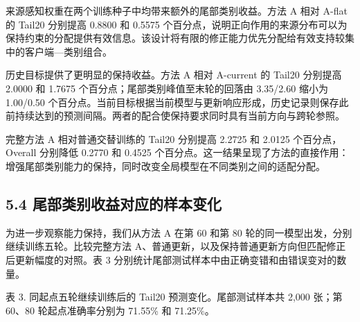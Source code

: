 \documentclass[UTF8,a4paper,10pt,fontset=fandol]{ctexart}
\begin{document}
来源感知权重在两个训练种子中均带来额外的尾部类别收益。方法 A 相对 A-flat 的 Tail20 分别提高 0.8800 和 0.5575 个百分点，说明正向作用的来源分布可以为保持约束的分配提供有效信息。该设计将有限的修正能力优先分配给有效支持较集中的客户端—类别组合。


历史目标提供了更明显的保持收益。方法 A 相对 A-current 的 Tail20 分别提高 2.0000 和 1.7675 个百分点；尾部类别峰值至末轮的回落由 3.35/2.60 缩小为 1.00/0.50 个百分点。当前目标根据当前模型与更新响应形成，历史记录则保存此前持续达到的预测间隔。两者的配合使保持要求同时具有当前方向与跨轮参照。


完整方法 A 相对普通交替训练的 Tail20 分别提高 2.2725 和 2.0125 个百分点，Overall 分别降低 0.2770 和 0.4525 个百分点。这一结果呈现了方法的直接作用：增强尾部类别能力的保持，同时改变全局模型在不同类别之间的适配分配。


\subsection*{5.4 尾部类别收益对应的样本变化}

为进一步观察能力保持，我们从方法 A 在第 60 和第 80 轮的同一模型出发，分别继续训练五轮。比较完整方法 A、普通更新，以及保持普通更新方向但匹配修正后更新幅度的对照。表 3 分别统计尾部测试样本中由正确变错和由错误变对的数量。


\noindent\begin{minipage}{\linewidth}{\small 表 3. 同起点五轮继续训练后的 Tail20 预测变化。尾部测试样本共 2,000 张；第 60、80 轮起点准确率分别为 71.55\% 和 71.25\%。\par}\medskip

\end{minipage}\par
\end{document}
